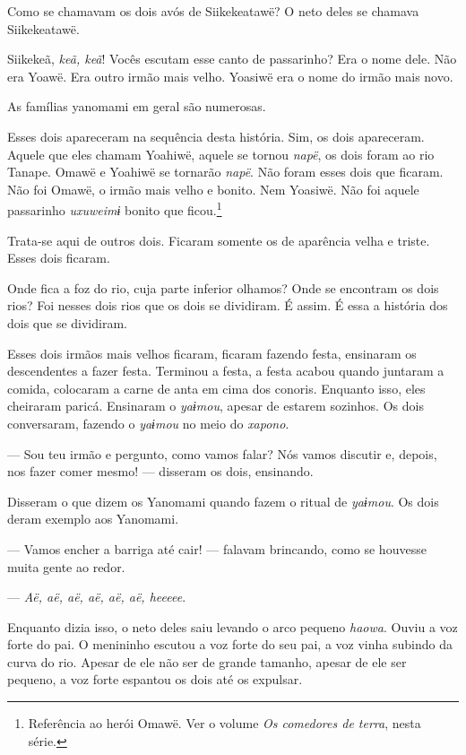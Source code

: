 Como se chamavam os dois avós de Siikekeatawë? O neto deles se chamava
Siikekeatawë. 

Siikekeã, \textit{keã, keã}! Vocês escutam esse canto de passarinho? Era o
nome dele. Não era Yoawë. Era outro irmão mais velho. Yoasiwë era o nome
do irmão mais novo. 

As famílias yanomami em geral são numerosas. 

Esses dois apareceram na sequência desta história. Sim, os dois
apareceram. Aquele que eles chamam Yoahiwë, aquele se
tornou \textit{napë}, os dois foram ao rio Tanape. Omawë e Yoahiwë se
tornarão \textit{napë}. Não foram esses dois que ficaram. Não foi Omawë, o
irmão mais velho e bonito. Nem Yoasiwë. Não foi aquele
passarinho \textit{uxuweimɨ} bonito que ficou.\footnote{Referência ao herói Omawë. 
Ver o volume \textit{Os comedores de terra}, nesta série.} 

Trata-se aqui de outros dois. Ficaram somente os de aparência velha e triste. Esses dois ficaram.

Onde fica a foz do rio, cuja parte inferior olhamos? Onde se encontram
os dois rios? Foi nesses dois rios que os dois se dividiram. É assim. É essa 
a história dos dois que se dividiram. 

Esses dois irmãos mais velhos ficaram, ficaram fazendo festa, ensinaram
os descendentes a fazer festa. Terminou a festa, a festa acabou quando
juntaram a comida, colocaram a carne de anta em cima dos conoris.
Enquanto isso, eles cheiraram paricá. Ensinaram o \textit{yaɨmou}, 
apesar de estarem sozinhos. Os dois conversaram, fazendo o \textit{yaɨmou} no meio do \textit{xapono}. 

--- Sou teu irmão e pergunto, como vamos falar? Nós vamos discutir e,
depois, nos fazer comer mesmo! --- disseram os dois, ensinando. 

Disseram o que dizem os Yanomami quando fazem o ritual de \textit{yaɨmou}.
Os dois deram exemplo aos Yanomami. 

--- Vamos encher a barriga até cair! --- falavam brincando, como se
houvesse muita gente ao redor. 

--- \textit{Aë, aë, aë, aë, aë, aë, heeeee}. 

Enquanto dizia isso, o neto deles saiu levando o arco pequeno \textit{haowa}.
Ouviu a voz forte do pai. O menininho escutou a voz forte do seu pai, a
voz vinha subindo da curva do rio. Apesar de ele não ser de grande
tamanho, apesar de ele ser pequeno, a voz forte espantou os dois até os
expulsar. 

